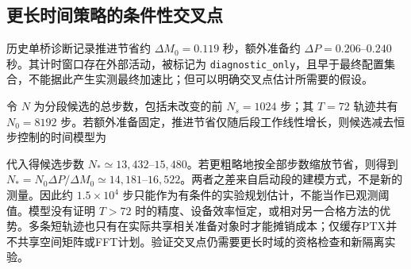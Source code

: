 \subsection{更长时间策略的条件性交叉点}
\label{sec:schedule-amortization}

历史单桥诊断记录推进节省约 $\Delta M_0=0.119$ 秒，额外准备约 $\Delta P=0.206$--$0.240$ 秒。其计时窗口存在外部活动，被标记为 \texttt{diagnostic\_only}，且早于最终配置集合，不能据此产生实测最终加速比；但可以明确交叉点估计所需要的假设。

令 $N$ 为分段候选的总步数，包括未改变的前 $N_s=1024$ 步；其 $T=72$ 轨迹共有 $N_0=8192$ 步。若额外准备固定，推进节省仅随后段工作线性增长，则候选减去恒步控制的时间模型为

代入得候选步数 $N_*\simeq13{,}432$--$15{,}480$。若更粗略地按全部步数缩放节省，则得到 $N_*=N_0\Delta P/\Delta M_0\simeq14{,}181$--$16{,}522$。两者之差来自启动段的建模方式，不是新的测量。因此约 $1.5\times10^4$ 步只能作为有条件的实验规划估计，不能当作已观测阈值。模型没有证明 $T>72$ 时的精度、设备效率恒定，或相对另一合格方法的优势。多条短轨迹也只有在实际共享相关准备对象时才能摊销成本；仅缓存PTX并不共享空间矩阵或FFT计划。验证交叉点仍需要更长时域的资格检查和新隔离实验。
